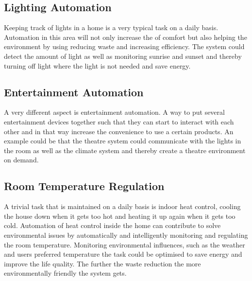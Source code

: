 \subsection{Lighting Automation}
\label{sub:Lighting Automation}
Keeping track of lights in a home is a very typical task on a daily basis. Automation in this area will not only increase the of comfort but also helping the environment by using reducing waste and increasing efficiency.  The system could detect the amount of light as well as monitoring sunrise and sunset and thereby turning off light where the light is not needed and save energy.

\subsection{Entertainment Automation}
\label{sub:Entertainment Automation}
A very different aspect is entertainment automation. A way to put several entertainment devices together such that they can start to interact with each other and in that way increase the convenience to use a certain products. An example could be that the theatre system could communicate with the lights in the room as well as the climate system and thereby create a theatre environment on demand.

\subsection{Room Temperature Regulation}
\label{sub:Room Temperature Regulation}
A trivial task that is maintained on a daily basis is indoor heat control, cooling the house down when it gets too hot and heating it up again when it gets too cold. Automation of heat control inside the home can contribute to solve environmental issues by automatically and intelligently monitoring and regulating the room temperature. Monitoring environmental influences, such as the weather and users preferred temperature the task could be optimised to save energy and improve the life quality.  The further the waste reduction the more environmentally friendly the system gets.

